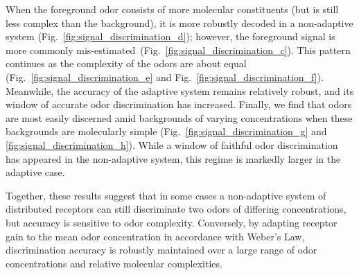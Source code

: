 When the foreground odor consists of more molecular constituents (but is still less complex than the background), it is more robustly decoded in a non-adaptive system (Fig.~\ref{fig:signal_discrimination_d}); however, the foreground signal is more commonly mis-estimated~(Fig.~\ref{fig:signal_discrimination_c}). This pattern continues as the complexity of the odors are about equal (Fig.~\ref{fig:signal_discrimination_e} and Fig.~\ref{fig:signal_discrimination_f}). Meanwhile, the accuracy of the adaptive system remains relatively robust, and its window of accurate odor discrimination has increased. Finally, we find that odors are most easily discerned amid backgrounds of varying concentrations when these backgrounds are molecularly simple (Fig.~\ref{fig:signal_discrimination_g} and \ref{fig:signal_discrimination_h}). While a window of faithful odor discrimination has appeared in the non-adaptive system, this regime is markedly larger in the adaptive case.

Together, these results suggest that in some cases a non-adaptive system of distributed receptors can still discriminate two odors of differing concentrations, but accuracy is sensitive to odor complexity. Conversely, by adapting receptor gain to the mean odor concentration in accordance with Weber's Law, discrimination accuracy is robustly maintained over a large range of odor concentrations and relative molecular complexities. 





